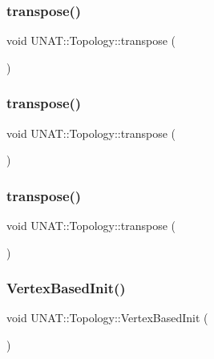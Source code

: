 \subsubsection{\texorpdfstring{transpose()}{transpose()}\hspace{0.1cm}{\footnotesize\ttfamily [1/3]}}
{\footnotesize\ttfamily void U\+N\+A\+T\+::\+Topology\+::transpose (\begin{DoxyParamCaption}{ }\end{DoxyParamCaption})}

\mbox{\label{classUNAT_1_1Topology_aee69e4993644c249fdaaf55627309309}} 
\subsubsection{\texorpdfstring{transpose()}{transpose()}\hspace{0.1cm}{\footnotesize\ttfamily [2/3]}}
{\footnotesize\ttfamily void U\+N\+A\+T\+::\+Topology\+::transpose (\begin{DoxyParamCaption}{ }\end{DoxyParamCaption})}

\mbox{\label{classUNAT_1_1Topology_aee69e4993644c249fdaaf55627309309}} 
\subsubsection{\texorpdfstring{transpose()}{transpose()}\hspace{0.1cm}{\footnotesize\ttfamily [3/3]}}
{\footnotesize\ttfamily void U\+N\+A\+T\+::\+Topology\+::transpose (\begin{DoxyParamCaption}{ }\end{DoxyParamCaption})}

\mbox{\label{classUNAT_1_1Topology_ad9846b484f49c6b4c55c5f9dbe6c6e77}} 
\subsubsection{\texorpdfstring{VertexBasedInit()}{VertexBasedInit()}\hspace{0.1cm}{\footnotesize\ttfamily [1/3]}}
{\footnotesize\ttfamily void U\+N\+A\+T\+::\+Topology\+::\+Vertex\+Based\+Init (\begin{DoxyParamCaption}{ }\end{DoxyParamCaption})\hspace{0.3cm}{\ttfamily [private]}}

